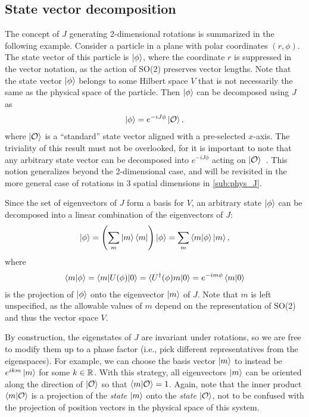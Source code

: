     \subsection{State vector decomposition}\label{sub:SO2_decomp}
    The concept of $J$ generating 2-dimensional rotations is summarized in the following example. Consider a particle in a plane with polar coordinates $(r,\phi)$. The state vector of this particle is $\ket{\phi}$, where the coordinate $r$ is suppressed in the vector notation, as the action of SO(2) preserves vector lengths. Note that the state vector $\ket{\phi}$ belongs to some Hilbert space $V$ that is not necessarily the same as the physical space of the particle. Then $\ket{\phi}$ can be decomposed using $J$ as
    \begin{align*}
        \ket{\phi} = e^{-iJ\phi}\ket{\mathcal{O}},
    \end{align*}
    where $\ket{\mathcal{O}}$ is a ``standard'' state vector aligned with a pre-selected $x$-axis. The triviality of this result must not be overlooked, for it is important to note that any arbitrary state vector can be decomposed into $e^{-iJ\phi}$ acting on $\ket{\mathcal{O}}$~\cite{Tung1985}. This notion generalizes beyond the 2-dimensional case, and will be revisited in the more general case of rotations in 3 spatial dimensions in \cref{sub:phys_J}.

    Since the set of eigenvectors of $J$ form a basis for $V$, an arbitrary state $\ket{\phi}$ can be decomposed into a linear combination of the eigenvectors of $J$:
    \begin{align*}
        \ket{\phi} = \left( \sum_{m} \ket{m}\bra{m} \right)\ket{\phi} = \sum_{m} \braket{m|\phi}\ket{m},
    \end{align*}
    where
    \begin{align*}
        \braket{m|\phi} = \braket{m|U(\phi)|0} = \braket{U^\dagger(\phi)m|0} = e^{-im\phi}\braket{m|0}
    \end{align*}
    is the projection of $\ket{\phi}$ onto the eigenvector $\ket{m}$ of $J$. Note that $m$ is left unspecified, as the allowable values of $m$ depend on the representation of SO(2) and thus the vector space $V$.

    By construction, the eigenstates of $J$ are invariant under rotations, so we are free to modify them up to a phase factor (i.e., pick  different representatives from the eigenspaces). For example, we can choose the basis vector $\ket{m}$ to instead be $e^{ikm}\ket{m}$ for some $k\in\mathbb{R}$.  With this strategy, all eigenvectors $\ket{m}$ can be oriented along the direction of $\ket{\mathcal{O}}$ so that $\braket{m|\mathcal{O}} = 1$. Again, note that the inner product $\braket{m|\mathcal{O}}$ is a projection of the \textit{state} $\ket{m}$ onto the \textit{state} $\ket{\mathcal{O}}$, not to be confused with the projection of position vectors in the physical space of this system.



